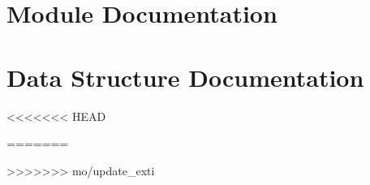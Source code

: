 \documentclass[twoside]{book}
\newcommand{\+}{\discretionary{\mbox{\scriptsize$\hookleftarrow$}}{}{}}
\begin{document}
\chapter{Module Documentation}































\chapter{Data Structure Documentation}




<<<<<<< HEAD

=======

>>>>>>> mo/update_exti


\end{document}

